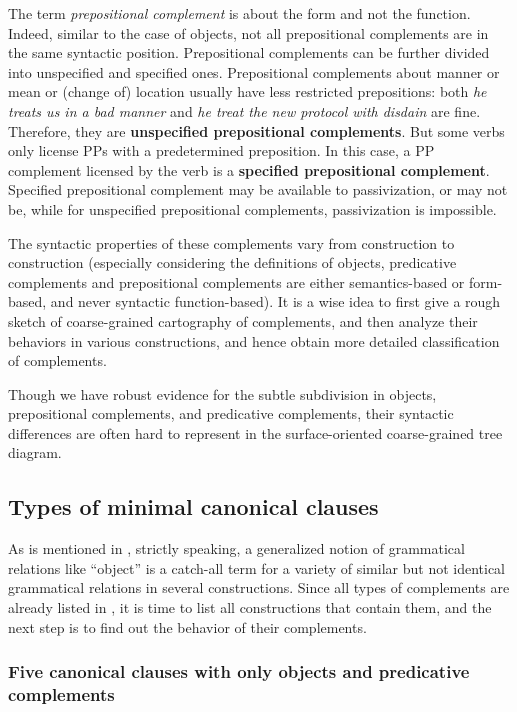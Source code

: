 \documentclass{article}
\newcommand*{\concept}[1]{\textbf{#1}}
\newcommand*{\term}[1]{\emph{#1}}
\newcommand*{\corpus}[1]{\emph{#1}}
\begin{document}
The term \term{prepositional complement} is about the form and not the function.
Indeed, similar to the case of objects,
not all prepositional complements are in the same syntactic position.
Prepositional complements can be further divided into unspecified and specified ones.
Prepositional complements about manner or mean or (change of) location usually have less restricted prepositions:
both \corpus{he treats us in a bad manner} and \corpus{he treat the new protocol with disdain} are fine.
Therefore, they are \concept{unspecified prepositional complements}.
But some verbs only license PPs with a predetermined preposition.
In this case, a PP complement licensed by the verb is a \concept{specified prepositional complement}.
Specified prepositional complement may be available to passivization, 
or may not be,
while for unspecified prepositional complements, passivization is impossible. %

The syntactic properties of these complements vary from construction to construction
(especially considering the definitions of objects, predicative complements and prepositional complements 
are either semantics-based or form-based, and never syntactic function-based).
It is a wise idea to first give a rough sketch of coarse-grained cartography of complements,
and then analyze their behaviors in various constructions, 
and hence obtain more detailed classification of complements.

Though we have robust evidence for the subtle subdivision 
in objects, prepositional complements, and predicative complements, 
their syntactic differences are often hard to represent in the surface-oriented coarse-grained tree diagram.

\subsection{Types of minimal canonical clauses}\label{sec:minimal-canonical-clause}

As is mentioned in ,
strictly speaking, 
a generalized notion of grammatical relations like ``object'' 
is a catch-all term for a variety of similar but not identical grammatical relations 
in several constructions.
Since all types of complements are already listed in ,
it is time to list all constructions that contain them, 
and the next step is to find out the behavior of their complements.

\subsubsection{Five canonical clauses with only objects and predicative complements}
\end{document}
